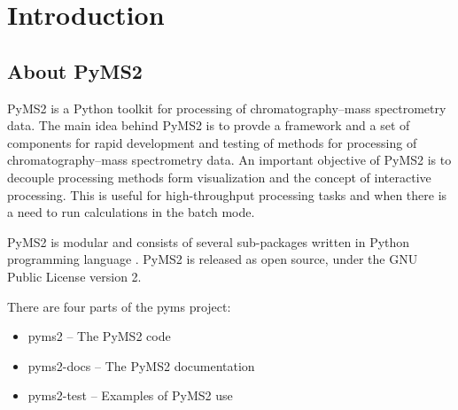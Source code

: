 

\chapter{Introduction}

\section{About PyMS2}

PyMS2 is a Python toolkit for processing of chromatography--mass spectrometry
data. The main idea behind PyMS2 is to provde a framework and a set of
components for rapid development and testing of methods for processing of
chromatography--mass spectrometry data. An important objective of PyMS2 is
to decouple processing methods form visualization and the concept of
interactive processing. This is useful for high-throughput processing tasks
and when there is a need to run calculations in the batch mode.

PyMS2 is modular and consists of several sub-packages written in Python
programming language \cite{python}. PyMS2 is released as open source,
under the GNU Public License version 2.

There are four parts of the pyms project:

\begin{itemize}
  \item pyms2 -- The PyMS2 code
  \item pyms2-docs -- The PyMS2 documentation
  \item pyms2-test -- Examples of PyMS2 use
\end{itemize}

